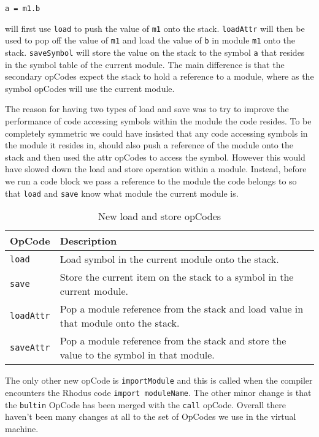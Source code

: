 \begin{lstlisting}
a = m1.b
\end{lstlisting}

will first use {\tt load} to push the value of {\tt m1} onto the stack. {\tt loadAttr} will then be used to pop off the value of {\tt m1} and load the value of {\tt b} in module {\tt m1} onto the stack. {\tt saveSymbol} will store the value on the stack to the symbol {\tt a} that resides in the symbol table of the current module. The main difference is that the secondary opCodes expect the stack to hold a reference to a module, where as the symbol opCodes will use the current module.

The reason for having two types of load and save was to try to improve the performance of code accessing symbols within the module the code resides. To be completely symmetric we could have insisted that any code accessing symbols in the module it resides in, should also push a reference of the module onto the stack and then used the attr opCodes to access the symbol. However this would have slowed down the load and store operation within a module. Instead, before we run a code block we pass a reference to the module the code belongs to so that {\tt load} and {\tt save} know what module the current module is.

\begin{table}
\centering
\begin{tabular}{lp{8.5cm}} \toprule
OpCode & Description \\ \midrule
{\tt load} & Load  symbol in the current module onto the stack. \\
{\tt save} & Store the current item on the stack to a symbol in the current module. \\
{\tt loadAttr} & Pop a module reference from the stack and load value in that module onto the stack. \\
{\tt saveAttr} & Pop a module reference from the stack and store the value to the symbol in that module.  \\ \bottomrule
\end{tabular}
\caption{New load and store opCodes}
\label{tbl:loadstore}
\end{table}

The only other new opCode is {\tt importModule} and this is called when the compiler encounters the Rhodus code {\tt import moduleName}. The other minor change is that the {\tt bultin} OpCode has been merged with the {\tt call} opCode. Overall there haven't been many changes at all to the set of OpCodes we use in the virtual machine.



